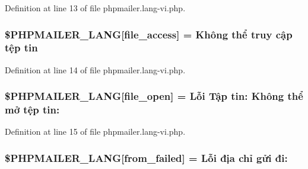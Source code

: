 Definition at line 13 of file phpmailer.\+lang-\/vi.\+php.

\subsubsection[{\texorpdfstring{\$\+P\+H\+P\+M\+A\+I\+L\+E\+R\+\_\+\+L\+A\+NG}{$PHPMAILER_LANG}}]{\setlength{\rightskip}{0pt plus 5cm}\$P\+H\+P\+M\+A\+I\+L\+E\+R\+\_\+\+L\+A\+NG\mbox{[}\textquotesingle{}file\+\_\+access\textquotesingle{}\mbox{]} = \textquotesingle{}Không thể truy cập tệp tin \textquotesingle{}}\hypertarget{phpmailer_8lang-vi_8php_a7e83349023b856ef9e5c46e30ae6d51e}{}\label{phpmailer_8lang-vi_8php_a7e83349023b856ef9e5c46e30ae6d51e}


Definition at line 14 of file phpmailer.\+lang-\/vi.\+php.

\subsubsection[{\texorpdfstring{\$\+P\+H\+P\+M\+A\+I\+L\+E\+R\+\_\+\+L\+A\+NG}{$PHPMAILER_LANG}}]{\setlength{\rightskip}{0pt plus 5cm}\$P\+H\+P\+M\+A\+I\+L\+E\+R\+\_\+\+L\+A\+NG\mbox{[}\textquotesingle{}file\+\_\+open\textquotesingle{}\mbox{]} = \textquotesingle{}Lỗi Tập tin\+: Không thể mở tệp tin\+: \textquotesingle{}}\hypertarget{phpmailer_8lang-vi_8php_a28d1a6517bf4c942a0ddd506188ad2e0}{}\label{phpmailer_8lang-vi_8php_a28d1a6517bf4c942a0ddd506188ad2e0}


Definition at line 15 of file phpmailer.\+lang-\/vi.\+php.

\subsubsection[{\texorpdfstring{\$\+P\+H\+P\+M\+A\+I\+L\+E\+R\+\_\+\+L\+A\+NG}{$PHPMAILER_LANG}}]{\setlength{\rightskip}{0pt plus 5cm}\$P\+H\+P\+M\+A\+I\+L\+E\+R\+\_\+\+L\+A\+NG\mbox{[}\textquotesingle{}from\+\_\+failed\textquotesingle{}\mbox{]} = \textquotesingle{}Lỗi địa chỉ gửi đi\+: \textquotesingle{}}\hypertarget{phpmailer_8lang-vi_8php_adf832ae12155a09be077c6d5e4fd7e22}{}\label{phpmailer_8lang-vi_8php_adf832ae12155a09be077c6d5e4fd7e22}


